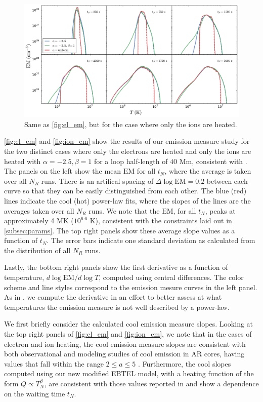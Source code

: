 \documentclass[apj]{emulateapj}
\begin{document}
	\begin{figure}
		\centering
		\includegraphics[width=2\columnwidth]{figures/em_grid_ion_a25.pdf}
		\caption{Same as \autoref{fig:el_em}, but for the case where only the ions are heated.}
		\label{fig:ion_em}
	\end{figure}
	\par \autoref{fig:el_em} and \autoref{fig:ion_em} show the results of our emission measure study for the two distinct cases where only the electrons are heated and only the ions are heated with $\alpha=-2.5,\beta=1$ for a loop half-length of $40$ Mm, consistent with . The panels on the left show the mean $\mathrm{EM}$ for all $t_N$, where the average is taken over all $N_{R}$ runs. There is an artifical spacing of $\Delta\log{\mathrm{EM}}=0.2$ between each curve so that they can be easily distinguished from each other. The blue (red) lines indicate the cool (hot) power-law fits, where the slopes of the lines are the averages taken over all $N_{R}$ runs. We note that the $\mathrm{EM}$, for all $t_N$, peaks at approximately 4 MK ($10^{6.6}$ K), consistent with the constraints laid out in \autoref{subsec:params}. The top right panels show these average slope values as a function of $t_N$. The error bars indicate one standard deviation as calculated from the distribution of all $N_{R}$ runs.
	\par Lastly, the bottom right panels show the first derivative as a function of temperature, $d\log{\mathrm{EM}}/d\log{T}$, computed using central differences. The color scheme and line styles correspond to the emission mesure curves in the left panel. As in , we compute the derivative in an effort to better assess at what temperatures the emission measure is not well described by a power-law.
	\par We first briefly consider the calculated cool emission measure slopes. Looking at the top right panels of \autoref{fig:el_em} and \autoref{fig:ion_em}, we note that in the cases of electron and ion heating, the cool emission measure slopes are consistent with both observational and modeling studies of cool emission in AR cores, having values that fall within the range $2\le a\le5$ \citep[and references therein]{bradshaw_diagnosing_2012}. Furthermore, the cool slopes computed using our new modified EBTEL model, with a heating function of the form $Q\propto T_N^{\beta}$, are consistent with those values reported in \citet{cargill_active_2014} and show a dependence on the waiting time $t_N$.  
\end{document}
